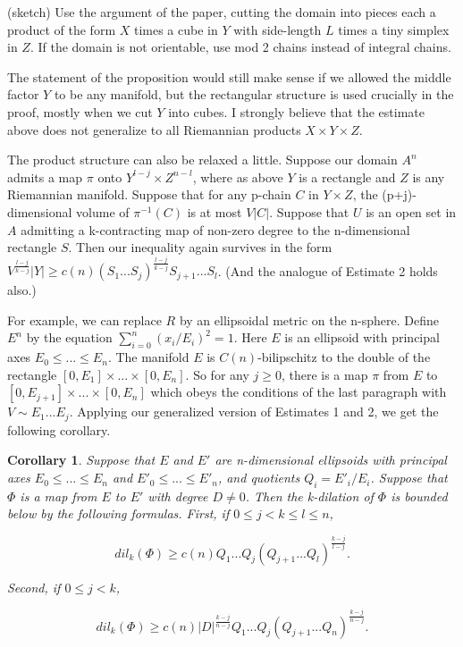\documentclass{amsart}
\newtheorem*{Theorem 1}{Theorem 1}
\newtheorem*{Theorem 2}{Theorem 2}
\newtheorem*{Estimate 1}{Estimate 1}
\newtheorem*{Estimate 2}{Estimate 2}
\newtheorem*{key lemma}{Key Lemma}
\newtheorem*{cor}{Corollary}
\numberwithin{equation}{section}
\begin{document}
\proof (sketch) Use the argument of the paper, cutting the domain
into pieces each a product of the form $X$ times a cube in $Y$
with side-length $L$ times a tiny simplex in $Z$. If the domain
is not orientable, use mod 2 chains instead of integral chains.
\endproof

The statement of the proposition would still make sense if we
allowed the middle factor $Y$ to be any manifold, but the
rectangular structure is used crucially in the proof, mostly when
we cut $Y$ into cubes.  I strongly believe that the estimate
above does not generalize to all Riemannian products $X \times Y
\times Z$.

The product structure can also be relaxed a little.  Suppose our
domain $A^n$ admits a map $\pi$ onto $Y^{l-j} \times Z^{n-l}$,
where as above $Y$ is a rectangle and $Z$ is any Riemannian
manifold.  Suppose that for any p-chain $C$ in $Y \times Z$, the
(p+j)-dimensional volume of $\pi^{-1}(C)$ is at most $V |C|$. 
Suppose that $U$ is an open set in $A$ admitting a k-contracting
map of non-zero degree to the n-dimensional rectangle $S$.  Then
our inequality again survives in the form $V^{\frac{l-j}{k-j}}
|Y| \ge c(n) (S_1 ... S_j)^{\frac{l-j}{k-j}} S_{j+1} ... S_l$. 
(And the analogue of Estimate 2 holds also.)

For example, we can replace $R$ by an ellipsoidal
metric on the n-sphere.  Define $E^n$ by the equation
$\sum_{i=0}^n (x_i / E_i)^2 = 1$.  Here $E$ is an ellipsoid
with principal axes $E_0 \le ... \le E_n$.  The manifold $E$ is
$C(n)$-bilipschitz to the double of the rectangle $[0, E_1]
\times ... \times [0, E_n]$.  So for any $j \ge 0$, there is a
map $\pi$ from $E$ to $[0, E_{j+1}] \times ... \times [0, E_n]$
which obeys the conditions of the last paragraph with $V \sim E_1
... E_j$.  Applying our generalized version of Estimates 1 and 2,
we get the following corollary.

\begin{cor} Suppose that $E$ and $E'$ are n-dimensional
ellipsoids with principal axes $E_0 \le ... \le E_n$ and $E'_0
\le ... \le E'_n$, and quotients $Q_i = E'_i / E_i$.  Suppose
that $\Phi$ is a map from $E$ to $E'$ with degree $D \not= 0$. 
Then the k-dilation of $\Phi$ is bounded below by the following
formulas.  First, if $0 \le j < k \le l \le n$,

$$dil_k(\Phi) \ge c(n) Q_1 ... Q_j (Q_{j+1} ...
Q_l)^{\frac{k-j}{l-j}}.$$

Second, if $0 \le j < k$, 

$$dil_k(\Phi) \ge c(n) |D|^{\frac{k-j}{n-j}} Q_1 ... Q_j (Q_{j+1}
... Q_n)^{\frac{k-j}{n-j}}.$$

\end{cor}
\end{document}
